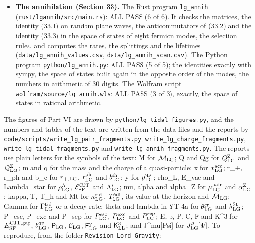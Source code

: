 \documentclass[
  10pt,
]{article}
\begin{document}
\begin{itemize}
  \texttt{data/lg\_tidal\_snapshots.csv} (the densities of Figure VI.2),
  \texttt{data/lg\_tidal\_gauss.csv},
  \texttt{data/lg\_tidal\_convergence.csv} and
  \texttt{data/lg\_tidal\_values.csv}; it runs for about half an hour.
  The Python program \texttt{python/lg\_tidal.py}: ALL PASS (10 of 10).
  It derives the tidal field and the fall by computer algebra, computes
  the static rates by complex rotation (\texttt{data/lg\_tidal\_cr.csv})
  and the quasi-static probability
  (\texttt{data/lg\_tidal\_quasistatic.csv}), and derives the
  perturbation series (32.5) and the weak-field rate (32.6). The Wolfram
  script \texttt{wolfram/source/lg\_tidal.wls}: ALL PASS (5 of 5),
  exactly.
\item
  \textbf{The annihilation (Section 33).} The Rust program
  \texttt{lg\_annih} (\texttt{rust/lgannih/src/main.rs}): ALL PASS (6 of
  6). It checks the matrices, the identity (33.1) on random plane waves,
  the anticommutators of (33.2) and the identity (33.3) in the space of
  states of eight fermion modes, the selection rules, and computes the
  rates, the splittings and the lifetimes
  (\texttt{data/lg\_annih\_values.csv},
  \texttt{data/lg\_annih\_scan.csv}). The Python program
  \texttt{python/lg\_annih.py}: ALL PASS (5 of 5); the identities
  exactly with sympy, the space of states built again in the opposite
  order of the modes, the numbers in arithmetic of 30 digits. The
  Wolfram script \texttt{wolfram/source/lg\_annih.wls}: ALL PASS (3 of
  3), exactly, the space of states in rational arithmetic.
\end{itemize}

The figures of Part VI are drawn by
\texttt{python/lg\_tidal\_figures.py}, and the numbers and tables of the
text are written from the data files and the reports by
\texttt{code/scripts/write\_lg\_pair\_fragments.py},
\texttt{write\_lg\_charge\_fragments.py},
\texttt{write\_lg\_tidal\_fragments.py} and
\texttt{write\_lg\_annih\_fragments.py}. The reports use plain letters
for the symbols of the text: M for \(\mathcal M_{\rm LG}\); Q and Qg for
\(Q^{\rm Z}_{\rm LG}\) and \(\mathcal Q^{\rm Z}_{\rm LG}\); m and q for
the mass and the charge of a quasi-particle; x for
\(x^{\rm acc}_{\rm LG}\); r\_+, r\_ph and b\_c for \(r_{+,\rm LG}\),
\(r^{\rm ph}_{\rm LG}\) and \(b^{\rm sh}_{\rm LG}\); y for
\(y^{\rm qp}_{\rm LG}\); rho\_L, E\_vac and Lambda\_star for
\(\rho^\Lambda_{\rm LG}\), \(\mathcal E^{\rm CJT}_{\rm SF}\) and
\(\Lambda^*_{\rm LG}\); mu, alpha and alpha\_Z for
\(\mu^{\rm pair}_{\rm LG}\) and \(\alpha^{\rm Z}_{\rm LG}\); kappa, T,
T\_h and Mt for \(\kappa^{\rm tid}_{\rm LG}\),
\(T^{\rm fall}_{\rm LG}\), its value at the horizon and
\(\tilde{\mathcal M}_{\rm LG}\); Gamma for \(\Gamma^{\rm tid}_{\rm LG}\)
or a decay rate; theta and lambda in YT-4a for
\(\theta^{\rm cr}_{\rm LG}\) and \(\lambda^{\rm St}_{\rm LG}\); P\_esc,
P\_exc and P\_sep for \(P^{\rm esc}_{\rm LG}\), \(P^{\rm exc}_{\rm LG}\)
and \(P^{\rm sep}_{\rm LG}\); E, b, P, C, F and K\^{}3 for
\(E^{\rm CJT,gap}_{\rm SF}\), \(b^{\rm qp}_{\rm LG}\),
\(\mathsf P_{\rm LG}\), \(\mathcal C_{\rm LG}\),
\(\mathsf F^{\rm v}_{\rm LG}\) and \(\mathsf K^3_{\rm LL}\); and
J\^{}mu{[}Psi{]} for \(J^\mu_{\rm LG}[\Psi]\). To reproduce, from the
folder \texttt{Revision\_Lord\_Gravity}:
\end{document}
